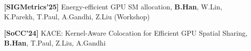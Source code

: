 \begin{zitemize}
    \item \textbf{[SIGMetrics'25]} Energy-efficient GPU SM allocation, \textbf{B.Han}, W.Lin, K.Parekh, T.Paul, A.Gandhi, Z.Liu (Workshop) 
    \item \textbf{[SoCC'24]} KACE: Kernel-Aware Colocation for Efficient GPU Spatial Sharing, \textbf{B.Han}, T.Paul, Z.Liu, A.Gandhi
\end{zitemize}